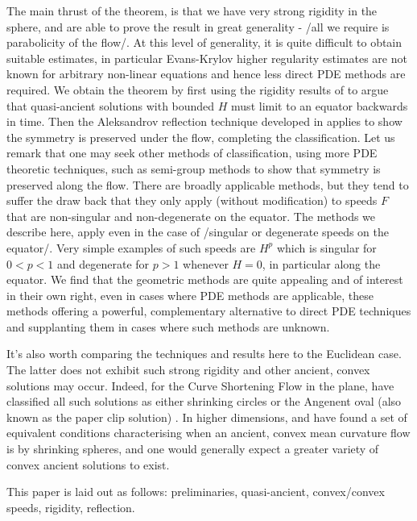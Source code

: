 \documentclass{amsart}
\begin{document}
The main thrust of the theorem, is that we have very strong rigidity in the sphere, and are able to prove the result in great generality - /all we require is parabolicity of the flow/. At this level of generality, it is quite difficult to obtain suitable estimates, in particular Evans-Krylov higher regularity estimates are not known for arbitrary non-linear equations and hence less direct PDE methods are required. We obtain the theorem by first using the rigidity results of \cite{matowskischeuer} to argue that quasi-ancient solutions with bounded \(H\) must limit to an equator backwards in time. Then the Aleksandrov reflection technique developed in \cite{bryanlouie,bryanivaki} applies to show the symmetry is preserved under the flow, completing the classification. Let us remark that one may seek other methods of classification, using more PDE theoretic techniques, such as semi-group methods to show that symmetry is preserved along the flow. There are broadly applicable methods, but they tend to suffer the draw back that they only apply (without modification) to speeds \(F\) that are non-singular and non-degenerate on the equator. The methods we describe here, apply even in the case of /singular or degenerate speeds on the equator/. Very simple examples of such speeds are \(H^p\) which is singular for \(0 < p < 1\) and degenerate for \(p > 1\) whenever \(H = 0\), in particular along the equator. We find that the geometric methods are quite appealing and of interest in their own right, even in cases where PDE methods are applicable, these methods offering a powerful, complementary alternative to direct PDE techniques and supplanting them in cases where such methods are unknown.

It's also worth comparing the techniques and results here to the Euclidean case. The latter does not exhibit such strong rigidity and other ancient, convex solutions may occur. Indeed, for the Curve Shortening Flow in the plane, \cite{hamdaskses} have classified all such solutions as either shrinking circles or the Angenent oval (also known as the paper clip solution) \cite{ang}. In higher dimensions, \cite{huiskensinestrari} and \cite{kleinerhaslhoffer} have found a set of equivalent conditions characterising when an ancient, convex mean curvature flow is by shrinking spheres, and one would generally expect a greater variety of convex ancient solutions to exist.

This paper is laid out as follows: preliminaries, quasi-ancient, convex/convex speeds, rigidity, reflection.
\end{document}

